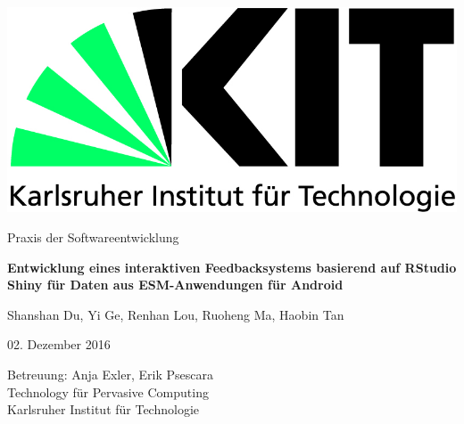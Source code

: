 \documentclass[a4paper]{scrreprt}
\begin{document}
 
    \begin{flushright}
        \includegraphics[scale = 0.7]{kit-logo.jpg}\\[0.5cm]
    \end{flushright}
    \vspace*{2cm} 

    \begin{center} \large 
    
        Praxis der Softwareentwicklung
        \vspace * {1.5cm}

        {\bf \huge Entwicklung eines interaktiven Feedbacksystems basierend auf RStudio Shiny f\"ur Daten aus ESM-Anwendungen f\"ur Android}
        \vspace*{2.5cm}

        Shanshan Du, Yi Ge, Renhan Lou, Ruoheng Ma, Haobin Tan
        \vspace*{1cm}

        02. Dezember 2016
        \vspace*{3.5cm}


    Betreuung: Anja Exler, Erik Psescara\\[1cm]
    Technology f\"ur Pervasive Computing\\[0.5cm]
        Karlsruher Institut für Technologie
    \end{center}
 
\end{document}
